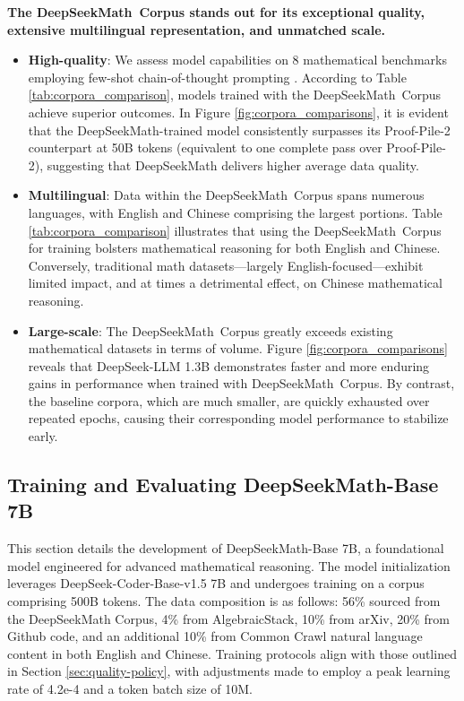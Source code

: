 \textbf{The DeepSeekMath~Corpus stands out for its exceptional quality, extensive multilingual representation, and unmatched scale.}

\begin{itemize}[topsep=0pt]
    \item \textbf{High-quality}:
    We assess model capabilities on 8 mathematical benchmarks employing few-shot chain-of-thought prompting \cite{cot}. According to Table \ref{tab:corpora_comparison}, models trained with the DeepSeekMath~Corpus achieve superior outcomes. In Figure \ref{fig:corpora_comparisons}, it is evident that the DeepSeekMath-trained model consistently surpasses its Proof-Pile-2 counterpart at 50B tokens (equivalent to one complete pass over Proof-Pile-2), suggesting that DeepSeekMath delivers higher average data quality.
    \item \textbf{Multilingual}:
    Data within the DeepSeekMath~Corpus spans numerous languages, with English and Chinese comprising the largest portions. Table \ref{tab:corpora_comparison} illustrates that using the DeepSeekMath~Corpus for training bolsters mathematical reasoning for both English and Chinese. Conversely, traditional math datasets—largely English-focused—exhibit limited impact, and at times a detrimental effect, on Chinese mathematical reasoning.
    \item \textbf{Large-scale}:
    The DeepSeekMath~Corpus greatly exceeds existing mathematical datasets in terms of volume. Figure \ref{fig:corpora_comparisons} reveals that DeepSeek-LLM 1.3B demonstrates faster and more enduring gains in performance when trained with DeepSeekMath~Corpus. By contrast, the baseline corpora, which are much smaller, are quickly exhausted over repeated epochs, causing their corresponding model performance to stabilize early.
\end{itemize}

\subsection{Training and Evaluating DeepSeekMath-Base 7B}

This section details the development of DeepSeekMath-Base 7B, a foundational model engineered for advanced mathematical reasoning. The model initialization leverages DeepSeek-Coder-Base-v1.5 7B \citep{deepseek-coder} and undergoes training on a corpus comprising 500B tokens. The data composition is as follows: 56\% sourced from the DeepSeekMath Corpus, 4\% from AlgebraicStack, 10\% from arXiv, 20\% from Github code, and an additional 10\% from Common Crawl natural language content in both English and Chinese. Training protocols align with those outlined in Section \ref{sec:quality-policy}, with adjustments made to employ a peak learning rate of 4.2e-4 and a token batch size of 10M.

